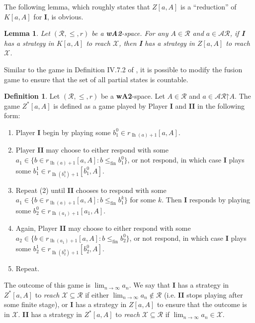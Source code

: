 \documentclass[11pt,reqno]{amsart}
\theoremstyle{plain}
\numberwithin{equation}{section}
\newtheorem{lemma}[theorem]{Lemma}
\theoremstyle{definition}
\newtheorem{definition}[theorem]{Definition}
\newcommand{\func}{\operatorname}
\newcommand{\cal}{\mathcal}
\newcommand{\restrictedto}{\mathord{\upharpoonright}}
\newcommand{\X}{\cal{X}}
\newcommand{\lh}{\func{lh}}
\newcommand{\fin}{\mathrm{fin}}
\begin{document}
The following lemma, which roughly states that $Z[a,A]$ is a ``reduction'' of $K[a,A]$ for \textbf{I}, is obvious.

\begin{lemma}
    Let $(\cal{R},\leq,r)$ be a \textbf{wA2}-space. For any $A \in \cal{R}$ and $a \in \cal{AR}$, if \textbf{I} has a strategy in $K[a,A]$ to reach $\X$, then \textbf{I} has a strategy in $Z[a,A]$ to reach $\X$.
\end{lemma}

Similar to the game in Definition IV.7.2 of \cite{AT05}, it is possible to modify the fusion game to ensure that the set of all partial states is countable.

\begin{definition}
\label{def:countable.fusion.game}
    Let $(\cal{R},\leq,r)$ be a \textbf{wA2}-space. Let $A \in \cal{R}$ and $a \in \cal{AR}\restrictedto A$. The game $Z^*[a,A]$ is defined as a game played by Player \textbf{I} and \textbf{II} in the following form:
    \begin{enumerate}
        \item Player \textbf{I} begin by playing some $b_1^0 \in r_{\lh(a)+1}[a,A]$.

        \item Player \textbf{II} may choose to either respond with some $a_1 \in \{b \in r_{\lh(a)+1}[a,A] : b \leq_\fin b_1^0\}$, or not respond, in which case \textbf{I} plays some $b_1^1 \in r_{\lh(b_1^0)+1}[b_1^0,A]$.

        \item Repeat (2) until \textbf{II} chooses to respond with some $a_1 \in \{b \in r_{\lh(a)+1}[a,A] : b \leq_\fin b_1^k\}$ for some $k$. Then \textbf{I} responds by playing some $b_2^0 \in r_{\lh(a_1)+1}[a_1,A]$.

        \item Again, Player \textbf{II} may choose to either respond with some $a_2 \in \{b \in r_{\lh(a_1)+1}[a,A] : b \leq_\fin b_2^0\}$, or not respond, in which case \textbf{I} plays some $b_2^1 \in r_{\lh(b_2^0)+1}[b_2^0,A]$.

        \item Repeat.
    \end{enumerate}
    The outcome of this game is $\lim_{n \to \infty} a_n$. We say that \textbf{I} has a strategy in $Z^*[a,A]$ to \emph{reach} $\X \subseteq \cal{R}$ if either $\lim_{n \to \infty} a_n \notin \cal{R}$ (i.e. \textbf{II} stops playing after some finite stage), or \textbf{I} has a strategy in $Z[a,A]$ to ensure that the outcome is in $\X$. \textbf{II} has a strategy in $Z^*[a,A]$ to \emph{reach} $\X \subseteq \cal{R}$ if $\lim_{n \to \infty} a_n \in \X$.
\end{definition}
\end{document}
